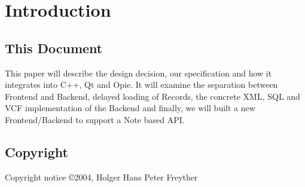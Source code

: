 \section{Introduction}

\subsection{This Document}
This paper will describe the design decision, our specification
and how it integrates into C++, Qt and Opie.
It will examine the separation between Frontend and Backend, delayed
loading of Records, the concrete XML, SQL and VCF implementation
of the Backend and finally, we will built a new Frontend/Backend
to support a Note based API.

\subsection{Copyright}

Copyright notice
\copyright 2004, Holger Hans Peter Freyther

